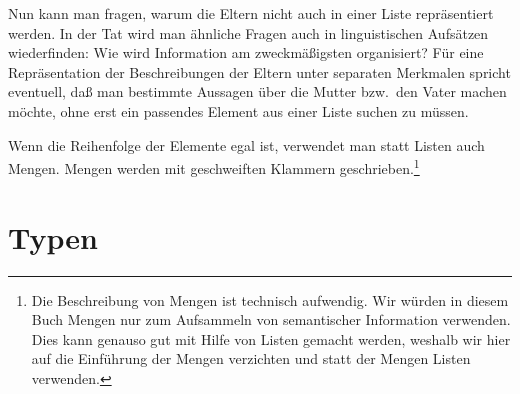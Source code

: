 \ea
{}
\z
Nun kann man fragen, warum die Eltern nicht auch in einer Liste repräsentiert werden.
In der Tat wird man ähnliche Fragen auch in linguistischen Aufsätzen wiederfinden:
Wie wird Information am zweckmäßigsten organisiert? Für eine Repräsentation der Beschreibungen
der Eltern unter separaten Merkmalen spricht eventuell, daß man bestimmte Aussagen über die
Mutter bzw.\ den Vater machen möchte, ohne erst ein passendes Element aus einer Liste suchen
zu müssen.

Wenn die Reihenfolge der Elemente egal ist, verwendet man statt Listen auch Mengen.
Mengen werden mit geschweiften Klammern geschrieben.\footnote{
 Die Beschreibung von Mengen ist technisch aufwendig.
 Wir würden in diesem Buch Mengen nur zum Aufsammeln von semantischer Information verwenden.
 Dies kann genauso gut mit Hilfe von Listen gemacht werden, weshalb wir hier auf die
 Einführung der Mengen verzichten und statt der Mengen Listen verwenden.%
}

\section{Typen}
\label{sec-formalismus-typen}

